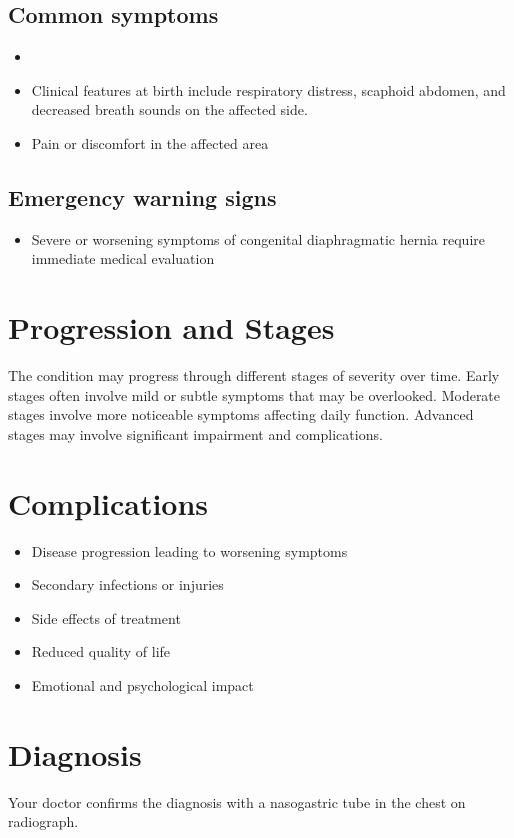 \subsection{Common symptoms}
\begin{itemize}[noitemsep]
  \item \item Clinical features at birth include respiratory distress, scaphoid abdomen, and decreased breath sounds on the affected side.

  \item Pain or discomfort in the affected area
  \end{itemize}

\subsection{Emergency warning signs}
\begin{itemize}[noitemsep]
  \item Severe or worsening symptoms of congenital diaphragmatic hernia require immediate medical evaluation
\end{itemize}
\section{Progression and Stages}
The condition may progress through different stages of severity over time. Early stages often involve mild or subtle symptoms that may be overlooked. Moderate stages involve more noticeable symptoms affecting daily function. Advanced stages may involve significant impairment and complications.
\section{Complications}
\begin{itemize}[noitemsep]
  \item Disease progression leading to worsening symptoms
  \item Secondary infections or injuries
  \item Side effects of treatment
  \item Reduced quality of life
  \item Emotional and psychological impact
\end{itemize}
\section{Diagnosis}
Your doctor confirms the diagnosis with a nasogastric tube in the chest on radiograph.

